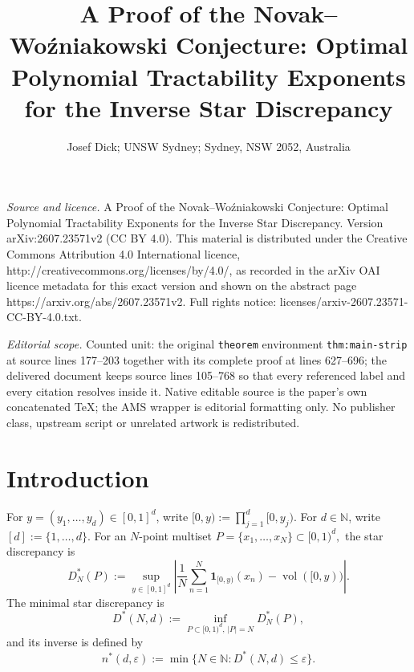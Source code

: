 \documentclass[10pt,a4paper]{amsart}
\newcommand{\1}{\mathbf{1}}
\newcommand{\N}{\mathbb{N}}
\newcommand{\vol}{\operatorname{vol}}
\begin{document}
\title[A Proof of the Novak--Wo'zniakowski Conjecture: Optimal Poly]{A Proof of the Novak--Wo\'{z}niakowski Conjecture: Optimal Polynomial Tractability Exponents for the Inverse Star Discrepancy}
\author{Josef Dick; UNSW Sydney; Sydney, NSW 2052, Australia}
\date{}
\maketitle
\noindent\emph{Source and licence.} A Proof of the Novak--Wo\'{z}niakowski Conjecture: Optimal Polynomial Tractability Exponents for the Inverse Star Discrepancy. Version arXiv:2607.23571v2 (CC BY 4.0). This material is distributed under the Creative Commons Attribution 4.0 International licence, http://creativecommons.org/licenses/by/4.0/, as recorded in the arXiv OAI licence metadata for this exact version and shown on the abstract page https://arxiv.org/abs/2607.23571v2. Full rights notice: licenses/arxiv-2607.23571-CC-BY-4.0.txt.\par\smallskip
\noindent\textit{Editorial scope.} Counted unit: the original \texttt{theorem} environment \texttt{thm:main-strip} at source lines 177--203 together with its complete proof at lines 627--696; the delivered document keeps source lines 105--768 so that every referenced label and every citation resolves inside it. Native editable source is the paper's own concatenated TeX; the AMS wrapper is editorial formatting only. No publisher class, upstream script or unrelated artwork is redistributed.
\section{Introduction}\label{sec:introduction}

For \(y=(y_1,\dots,y_d)\in[0,1]^d\), write
$
 [0,y):=\prod_{j=1}^d[0,y_j). 
$ For \(d\in\mathbb{N} \), write \([d]:=\{1,\dots,d\}\).
For an \(N\)-point multiset
$
 P=\{x_1,\dots,x_N\}\subset[0,1)^d,
$
the star discrepancy is
\begin{equation*}
 D_N^{\ast}(P)
 :=
 \sup_{y\in[0,1]^d}
 \left|
 \frac1N\sum_{n=1}^N\1_{[0,y)}(x_n)
 -\vol([0,y))
 \right|.
\end{equation*}
The minimal star discrepancy is
\begin{equation*}
 D^{\ast}(N,d)
 :=
 \inf_{P\subset[0,1)^d,\,|P|=N}D_N^{\ast}(P),
\end{equation*}
and its inverse is defined by
\begin{equation*}
 n^{\ast}(d,\varepsilon)
 :=
 \min\{N\in\N: D^{\ast}(N,d)\le\varepsilon\}.
\end{equation*}
\end{document}
